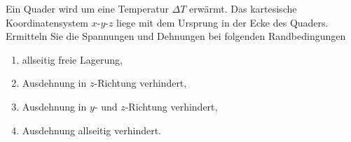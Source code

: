 \documentclass{exercise}
\begin{document}
    \begin{problem}
        Ein Quader wird um eine Temperatur \(\Delta T\) erwärmt.
        Das kartesische Koordinatensystem \(x\)-\(y\)-\(z\) liege mit dem Ursprung in der Ecke des Quaders.
        Ermitteln Sie die Spannungen und Dehnungen bei folgenden Randbedingungen
        \begin{enumerate}
            \item allseitig freie Lagerung,
            \item Ausdehnung in \(z\)-Richtung verhindert,
            \item Ausdehnung in \(y\)- und \(z\)-Richtung verhindert,
            \item Ausdehnung allseitig verhindert.
        \end{enumerate}
    \end{problem}
    
\end{document}

